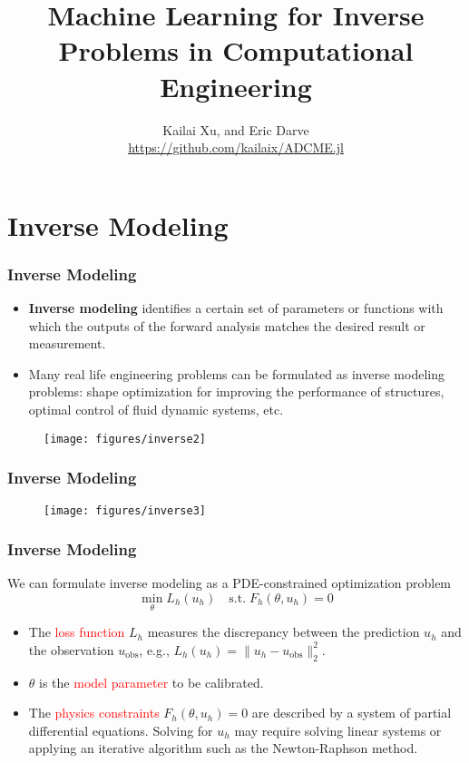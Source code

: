\documentclass[usenames,dvipsnames]{beamer}
\title[ML for Computational Engineering]{Machine Learning for Inverse Problems in Computational Engineering} %
\author[ADCME]{Kailai Xu, and Eric Darve \\ \url{https://github.com/kailaix/ADCME.jl}} %
\date{}%
\begin{document}
\begin{frame}

\titlepage %

\end{frame}
\usebackgroundtemplate{}

\section{Inverse Modeling}




\begin{frame}
	\frametitle{Inverse Modeling}
	\begin{itemize}
		\item \textbf{Inverse modeling} identifies a certain set of parameters or functions with which the outputs of the forward analysis matches the desired result or measurement.
		\item Many real life engineering problems can be formulated as inverse modeling problems: shape optimization for improving the performance of structures, optimal control of fluid dynamic systems, etc.
	\end{itemize}
	\begin{figure}[hbt]
		\centering
		\texttt{[image: figures/inverse2]}
	\end{figure}
\end{frame}


\begin{frame}
	\frametitle{Inverse Modeling}
	\begin{figure}
	\centering
  \texttt{[image: figures/inverse3]}
\end{figure}
\end{frame}

\begin{frame}
	\frametitle{Inverse Modeling}
	We can formulate inverse modeling as a PDE-constrained optimization problem 
	\begin{equation*}
		\min_{\theta} L_h(u_h) \quad \mathrm{s.t.}\; F_h(\theta, u_h) = 0
	\end{equation*}
	\begin{itemize}
		\item The \textcolor{red}{loss function} $L_h$ measures the discrepancy between the prediction $u_h$ and the observation $u_{\mathrm{obs}}$, e.g., $L_h(u_h) = \|u_h - u_{\mathrm{obs}}\|_2^2$. 
		\item $\theta$ is the \textcolor{red}{model parameter} to be calibrated. 
		\item The \textcolor{red}{physics constraints} $F_h(\theta, u_h)=0$ are described by a system of partial differential equations. Solving for $u_h$ may require solving linear systems or applying an iterative algorithm such as the Newton-Raphson method. 
	\end{itemize}
\end{frame}
\end{document}
